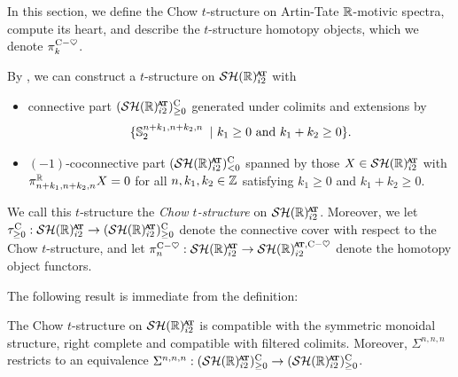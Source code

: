 In this section, we define the Chow $t$-structure on Artin-Tate $\mathbb{R}$-motivic spectra, compute its heart, and describe the $t$-structure homotopy objects, which we denote $\pi^{\mathrm{C}-\heartsuit} _k$.

\begin{dfn}
  By \cite[Proposition 1.2.1.16]{HA}, we can construct a $t$-structure on $\SHRat$ with
	\begin{itemize}
	\item connective part $(\SHRat)^{\cn} _{\geq 0}$ generated under colimits and extensions by \[\{ \operatorname{\mathbb{S}}_2^{n+k_1,n+k_2,n}\ \vert \ k_1 \geq 0 \text{ and } k_1 + k_2 \geq 0 \}.\]
	\item $(-1)$-coconnective part $(\SHRat)^{\cn} _{< 0}$ spanned by those $X \in \SHRat$ with $\pi_{n+k_1, n+k_2, n} ^{\mathbb{R}} X = 0$ for all $n,k_1,k_2 \in \mathbb{Z}$ satisfying $k_1 \geq 0$ and $k_1+k_2 \geq 0$.
	\end{itemize}
  We call this $t$-structure the \emph{Chow $t$-structure} on $\SHRat$.
%
%
%
%
  Moreover, we let $\tau_{\geq 0} ^{\cn} : \SHRat \to (\SHRat)^{\cn} _{\geq 0}$ denote the connective cover with respect to the Chow $t$-structure, and let $\pi_n ^{\ch} : \SHRat \to \SHR_{i2}^{\at, \ch}$ denote the homotopy object functors.
\end{dfn}

The following result is immediate from the definition:
\begin{prop}
  The Chow $t$-structure on $\SHRat$ is compatible with the symmetric monoidal structure, right complete and compatible with filtered colimits.
  Moreover, $\Sigma^{n,n,n}$ restricts to an equivalence $\Sigma^{n,n,n} : (\SHRat)^{\cn} _{\geq 0} \to (\SHRat)^{\cn} _{\geq 0}$.
\end{prop}

